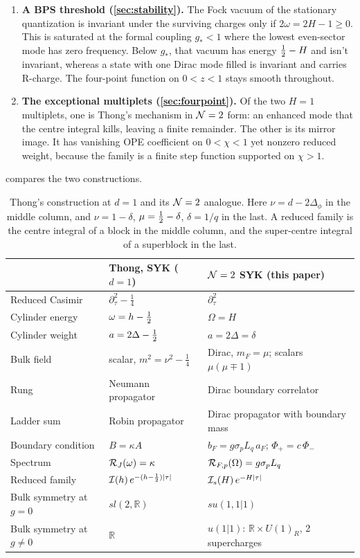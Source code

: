 \begin{enumerate}
\item \textbf{A BPS threshold (\cref{sec:stability}).} The Fock vacuum of the stationary quantization is invariant under the surviving charges only if $2\omega=2H-1\ge0$. This is saturated at the formal coupling $g_*<1$ where the lowest even-sector mode has zero frequency. Below $g_*$, that vacuum has energy $\tfrac12-H$ and isn't invariant, whereas a state with one Dirac mode filled is invariant and carries R-charge. The four-point function on $0<z<1$ stays smooth throughout.

\item \textbf{The exceptional multiplets (\cref{sec:fourpoint}).} Of the two $H=1$ multiplets, one is Thong's mechanism in $\mathcal{N}=2$ form: an enhanced mode that the centre integral kills, leaving a finite remainder. The other is its mirror image. It has vanishing OPE coefficient on $0<\chi<1$ yet nonzero reduced weight, because the family is a finite step function supported on $\chi>1$.
\end{enumerate}

 compares the two constructions.

\begin{table}[t]
\centering
\renewcommand{\arraystretch}{1.25}
\begin{tabular}{@{}lll@{}}
\toprule
& Thong, SYK ($d=1$) & $\mathcal{N}=2$ SYK (this paper)\\
\midrule
Reduced Casimir & $\partial_\tau^2-\tfrac14$ & $\partial_\tau^2$\\
Cylinder energy & $\omega=h-\tfrac12$ & $\Omega=H$\\
Cylinder weight & $a=2\Delta-\tfrac12$ & $a=2\Delta=\delta$\\
Bulk field & scalar, $m^2=\nu^2-\tfrac14$ & Dirac, $m_F=\mu$; scalars $\mu(\mu\mp1)$\\
Rung & Neumann propagator & Dirac boundary correlator\\
Ladder sum & Robin propagator & Dirac propagator with boundary mass\\
Boundary condition & $B=\kappa A$ & $b_F=g\sigma_pL_q\,a_F$; $\Phi_+=c\,\Phi_-$\\
Spectrum & $\mathcal{R}_J(\omega)=\kappa$ & $\mathcal{R}_{F,p}(\Omega)=g\sigma_pL_q$\\
Reduced family & $\mathcal{I}(h)\,e^{-(h-\frac12)|\tau|}$ & $\mathcal{I}_s(H)\,e^{-H|\tau|}$\\
Bulk symmetry at $g=0$ & $sl(2,\mathbb R)$ & $su(1,1|1)$\\
Bulk symmetry at $g\neq0$ & $\mathbb R$ & $u(1|1)$: $\mathbb R\times U(1)_R$, 2 supercharges\\
\bottomrule
\end{tabular}
\caption{Thong's construction at $d=1$ and its $\mathcal{N}=2$ analogue. Here $\nu=d-2\Delta_\phi$ in the middle column, and $\nu=1-\delta$, $\mu=\tfrac12-\delta$, $\delta=1/q$ in the last. A reduced family is the centre integral of a block in the middle column, and the super-centre integral of a superblock in the last.}
\label{tab:dictionary}
\end{table}


